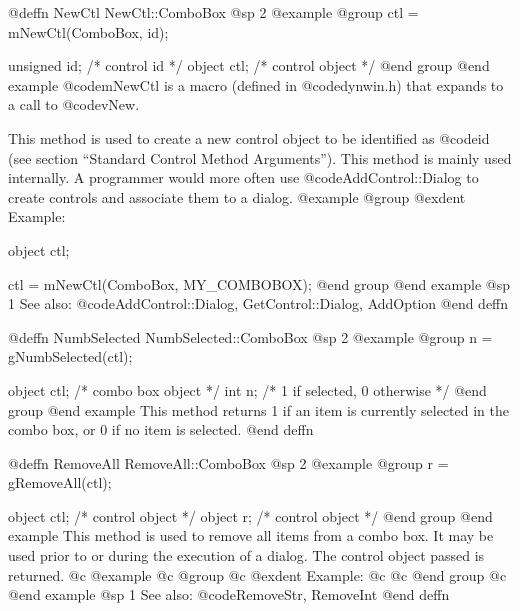 {@deffn {NewCtl} NewCtl::ComboBox
@sp 2
@example
@group
ctl = mNewCtl(ComboBox, id);

unsigned  id;   /*  control id      */
object   ctl;   /*  control object  */
@end group
@end example
@code{mNewCtl} is a macro (defined in @code{dynwin.h}) that expands to
a call to @code{vNew}.

This method is used to create a new control object to be identified as
@code{id} (see section ``Standard Control Method Arguments'').  This
method is mainly used internally.  A programmer would more often
use @code{AddControl::Dialog} to create controls and associate them
to a dialog.
@example
@group
@exdent Example:

object  ctl;

ctl = mNewCtl(ComboBox, MY_COMBOBOX);
@end group
@end example
@sp 1
See also:  @code{AddControl::Dialog, GetControl::Dialog, AddOption}
@end deffn



@deffn {NumbSelected} NumbSelected::ComboBox
@sp 2
@example
@group
n = gNumbSelected(ctl);

object  ctl;   /*  combo box object  */
int     n;     /*  1 if selected, 0 otherwise  */
@end group
@end example
This method returns 1 if an item is currently selected in the combo
box, or 0 if no item is selected.
@end deffn




















@deffn {RemoveAll} RemoveAll::ComboBox
@sp 2
@example
@group
r = gRemoveAll(ctl);

object  ctl;    /*  control object  */
object  r;      /*  control object  */
@end group
@end example
This method is used to remove all items from a combo box.  It may be used
prior to or during the execution of a dialog.  The control object passed
is returned.
@c @example
@c @group
@c @exdent Example:
@c 
@c @end group
@c @end example
@sp 1
See also:  @code{RemoveStr, RemoveInt}
@end deffn

















}
